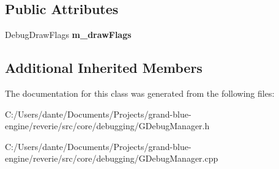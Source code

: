 \subsection*{Public Attributes}
\begin{DoxyCompactItemize}
\item 
\mbox{\label{classrev_1_1_debug_draw_settings_a8ca9cf7ce1312f483b1fb9f060d6b15d}} 
Debug\+Draw\+Flags {\bfseries m\+\_\+draw\+Flags}
\end{DoxyCompactItemize}
\subsection*{Additional Inherited Members}


The documentation for this class was generated from the following files\+:\begin{DoxyCompactItemize}
\item 
C\+:/\+Users/dante/\+Documents/\+Projects/grand-\/blue-\/engine/reverie/src/core/debugging/G\+Debug\+Manager.\+h\item 
C\+:/\+Users/dante/\+Documents/\+Projects/grand-\/blue-\/engine/reverie/src/core/debugging/G\+Debug\+Manager.\+cpp\end{DoxyCompactItemize}
